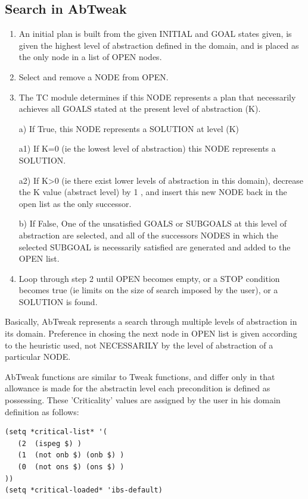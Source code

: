 \subsection{Search in AbTweak}
\begin{enumerate}
\item An initial plan is built from the given INITIAL and GOAL states given, 
   is given the highest level of abstraction defined in the domain, and is
   placed as the only node in a list of OPEN nodes.

\item Select and remove a NODE from OPEN.

\item The TC module determines if this NODE represents a plan that necessarily achieves all GOALS stated at the present level of abstraction (K).

a)   If True, this NODE represents a SOLUTION at level (K)

   a1)   If K=0 (ie the lowest level of abstraction) this NODE represents
         a SOLUTION.

   a2)   If K>0 (ie there exist lower levels of abstraction in this domain),
         decrease the K value (abstract level) by 1 , and insert this new
         NODE back in the open list as the only successor.

b)   If False, One of the unsatisfied GOALS or SUBGOALS at this level
     of abstraction are selected, and all of
     the successors NODES in which the selected SUBGOAL is necessarily satisfied
     are generated and added to the OPEN list.

\item Loop through step 2 until OPEN becomes empty, or a STOP condition becomes 
   true (ie limits on the size of search imposed by the user), or a SOLUTION
   is found.
\end{enumerate}

Basically, AbTweak represents a search through multiple levels of abstraction 
in its domain.  Preference in chosing the next node in OPEN list is given according to the heuristic used, not
NECESSARILY by the level of abstraction of a particular NODE.

AbTweak functions are similar to Tweak functions, and differ only in that
allowance is made for the abstractin level each precondition is defined as
possessing.  These 'Criticality' values are assigned by the user in his domain
definition as follows:

\begin{verbatim}
(setq *critical-list* '(
   (2  (ispeg $) )
   (1  (not onb $) (onb $) )
   (0  (not ons $) (ons $) )
))
(setq *critical-loaded* 'ibs-default)
\end{verbatim}

